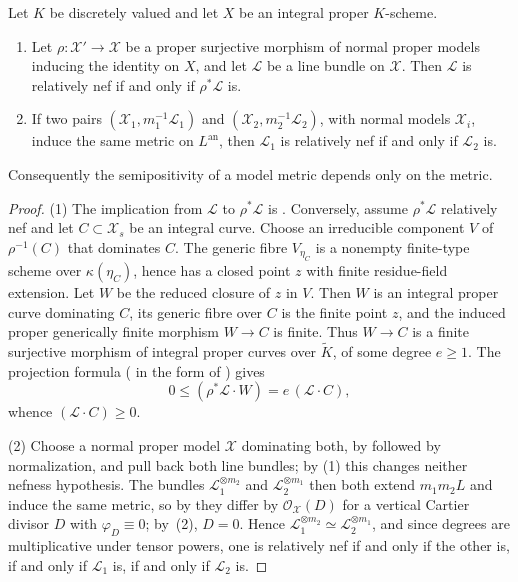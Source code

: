 \begin{lemma}
\label{lem:metrics-nef-independence}
Let $K$ be discretely valued and let $X$ be an integral proper
$K$-scheme.
\begin{enumerate}
\item Let $\rho:\mathcal X'\to\mathcal X$ be a proper surjective morphism
of normal proper models inducing the identity on $X$, and let
$\mathcal L$ be a line bundle on $\mathcal X$. Then $\mathcal L$ is
relatively nef if and only if $\rho^*\mathcal L$ is.
\item If two pairs $(\mathcal X_1,m_1^{-1}\mathcal L_1)$ and
$(\mathcal X_2,m_2^{-1}\mathcal L_2)$, with normal models
$\mathcal X_i$, induce the same metric on $L^{\mathrm{an}}$, then
$\mathcal L_1$ is relatively nef if and only if $\mathcal L_2$ is.
\end{enumerate}
Consequently the semipositivity of a model metric depends only on the
metric.
\end{lemma}

\begin{proof}
(1) The implication from $\mathcal L$ to $\rho^*\mathcal L$ is
. Conversely, assume $\rho^*\mathcal L$
relatively nef and let $C\subset\mathcal X_s$ be an integral curve. Choose
an irreducible component $V$ of $\rho^{-1}(C)$ that dominates $C$.
The generic fibre $V_{\eta_C}$ is a nonempty finite-type scheme over
$\kappa(\eta_C)$, hence has a closed point $z$ with finite residue-field
extension. Let $W$ be the reduced closure of $z$ in $V$. Then $W$ is an
integral proper curve dominating $C$, its generic fibre over $C$ is the
finite point $z$, and the induced proper generically finite morphism
$W\to C$ is finite. Thus $W\to C$ is a finite surjective morphism of
integral proper curves over $\widetilde K$, of some degree $e\ge1$.
The projection formula
( in the form of
\cite[Proposition~2.5(c)]{Ful}) gives
\[
 0\le(\rho^*\mathcal L\cdot W)=e\,(\mathcal L\cdot C),
\]
whence $(\mathcal L\cdot C)\ge0$.

(2) Choose a normal proper model $\mathcal X$ dominating both, by
 followed by normalization, and pull back both
line bundles; by (1) this changes neither nefness hypothesis. The bundles
$\mathcal L_1^{\otimes m_2}$ and $\mathcal L_2^{\otimes m_1}$ then both
extend $m_1m_2L$ and induce the same metric, so by
 they differ by
$\mathcal O_{\mathcal X}(D)$ for a vertical Cartier divisor $D$ with
$\varphi_D\equiv0$; by
\,(2), $D=0$. Hence
$\mathcal L_1^{\otimes m_2}\simeq\mathcal L_2^{\otimes m_1}$, and since
degrees are multiplicative under tensor powers, one is relatively nef if and
only if the other is, if and only if $\mathcal L_1$ is, if and only if
$\mathcal L_2$ is.
\end{proof}

